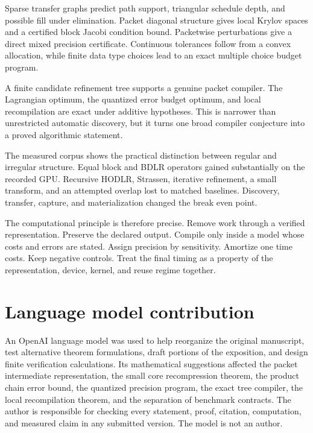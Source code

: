 \documentclass{aomart}
\theoremstyle{definition}
\theoremstyle{remark}
\begin{document}
Sparse transfer graphs predict path support, triangular schedule depth, and possible fill under elimination. Packet diagonal structure gives local Krylov spaces and a certified block Jacobi condition bound. Packetwise perturbations give a direct mixed precision certificate. Continuous tolerances follow from a convex allocation, while finite data type choices lead to an exact multiple choice budget program.

A finite candidate refinement tree supports a genuine packet compiler. The Lagrangian optimum, the quantized error budget optimum, and local recompilation are exact under additive hypotheses. This is narrower than unrestricted automatic discovery, but it turns one broad compiler conjecture into a proved algorithmic statement.

The measured corpus shows the practical distinction between regular and irregular structure. Equal block and BDLR operators gained substantially on the recorded GPU. Recursive HODLR, Strassen, iterative refinement, a small transform, and an attempted overlap lost to matched baselines. Discovery, transfer, capture, and materialization changed the break even point.

The computational principle is therefore precise. Remove work through a verified representation. Preserve the declared output. Compile only inside a model whose costs and errors are stated. Assign precision by sensitivity. Amortize one time costs. Keep negative controls. Treat the final timing as a property of the representation, device, kernel, and reuse regime together.

\section*{Language model contribution}

An OpenAI language model was used to help reorganize the original manuscript, test alternative theorem formulations, draft portions of the exposition, and design finite verification calculations. Its mathematical suggestions affected the packet intermediate representation, the small core recompression theorem, the product chain error bound, the quantized precision program, the exact tree compiler, the local recompilation theorem, and the separation of benchmark contracts. The author is responsible for checking every statement, proof, citation, computation, and measured claim in any submitted version. The model is not an author.



\end{document}
